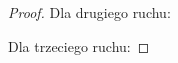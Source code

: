 \begin{proof}
Dla drugiego ruchu:
\begin{comment}
\begin{align*}
    \bracket{\reidemeisterIIa} &\stackrel{K3}{=} A
    \bracket{\reidemeisterIab}
    + A^{-1} \bracket{\begin{tikzpicture}[baseline=-0.65ex,scale=0.07]
    \useasboundingbox (-5, -6) rectangle (5, 6);
    \begin{knot}[clip width=5, end tolerance=1pt]
        \strand[semithick] (4,-5) .. controls (4,-2) and (-4,-2) .. (-4,0);
        \strand[semithick] (4,5) to (4,0);
        \strand[semithick] (-4,-5) .. controls (-4,-2) and (4,-2) .. (4,0);
        \strand[semithick] (-4,5) to (-4,0);
    \end{knot}
    \end{tikzpicture}}
    \stackrel{K1}{=} -A^{-2} \bracket{\LittleLeftSmoothing} + A^{-1}
    \bracket{\begin{tikzpicture}[baseline=-0.65ex,scale=0.07]
    \useasboundingbox (-5, -6) rectangle (5, 6);
    \begin{knot}[clip width=5, end tolerance=1pt]
        \strand[semithick] (4,-5) .. controls (4,-2) and (-4,-2) .. (-4,0);
        \strand[semithick] (4,5) to (4,0);
        \strand[semithick] (-4,-5) .. controls (-4,-2) and (4,-2) .. (4,0);
        \strand[semithick] (-4,5) to (-4,0);
    \end{knot}
    \end{tikzpicture}}
    \\ & \stackrel{K3}{=} -A^{-2} \bracket{\LittleLeftSmoothing}
    + A^{-1}A \bracket{\LittleRightSmoothing} + A^{-1}A^{-1} \bracket{\LittleLeftSmoothing}
    = \bracket{\LittleRightSmoothing}
\end{align*}
\end{comment}

Dla trzeciego ruchu:
\begin{comment}
\begin{align*}
\bracket{\,\reidemeisterIIIa\,} &\stackrel{K3}{=} A
\bracket{\,\begin{tikzpicture}[baseline=-0.65ex,yscale=0.07, xscale=0.1]
    \useasboundingbox (-5, -6) rectangle (5, 6);
    \begin{knot}[clip width=5, flip crossing/.list={1,2,3}, end tolerance=1pt]
        \strand[semithick] (-5, 5) [in=-135, out=-45] to (5,5);
        \strand[semithick] (-5, -5) [in=135, out=45] to (5,-5);
        \strand[semithick] (-5, 0) .. controls (-2, 0) and (-2,5) .. (0,5) .. controls (2, 5) and (2, 0) .. (5, 0);
    \end{knot}
    \end{tikzpicture}\,}
+A^{-1} \bracket{\RightCrossSmoothing} \\
& \stackrel{R2}{=} A \bracket{\,\LeftCrossSmoothing\,} +A^{-1} \bracket{\RightCrossSmoothing}
\stackrel{K3}{=} \bracket{\,\reidemeisterIIIb\,}
\end{align*}
korzystaliśmy tu z~własności drugiego ruchu.
\end{comment}
\end{proof}

